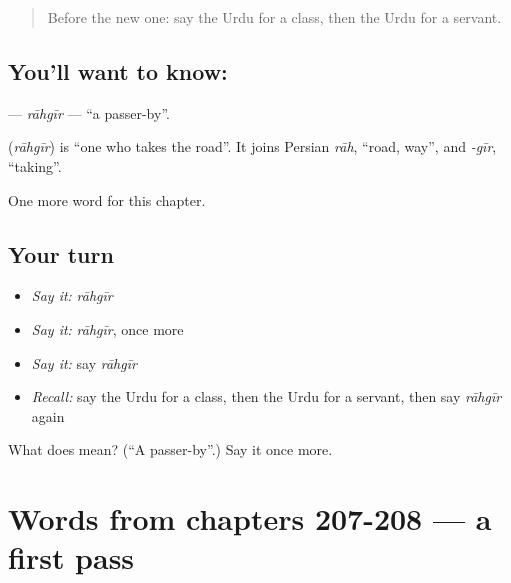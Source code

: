 \begin{quote}
Before the new one: say the Urdu for a class, then the Urdu for a servant.
\end{quote}

\subsection*{You'll want to know: }
\textbf{} — \emph{rāhgīr} — \textquotedblleft{}a passer-by\textquotedblright{}.

\begin{cousinweb}
\textbf{} (\emph{rāhgīr}) is \textquotedblleft{}one who takes the road\textquotedblright{}. It joins Persian \emph{rāh}, \textquotedblleft{}road, way\textquotedblright{}, and \emph{-gīr}, \textquotedblleft{}taking\textquotedblright{}.
\end{cousinweb}

\begin{grammarlens}[title={What you've built}]
One more word for this chapter.
\end{grammarlens}

\subsection*{Your turn}
\begin{itemize}
\raggedright
  \item \emph{Say it:} \emph{rāhgīr}
  \item \emph{Say it:} \emph{rāhgīr}, once more
  \item \emph{Say it:} say \emph{rāhgīr}
  \item \emph{Recall:} say the Urdu for a class, then the Urdu for a servant, then say \emph{rāhgīr} again
\end{itemize}

\begin{tcolorbox}[breakable,colback=teal!4,colframe=teal!35!black,title={Before you move on}]
What does  mean? (\textquotedblleft{}A passer-by\textquotedblright{}.) Say it once more.
\end{tcolorbox}
\section[(dialogue)]{Words from chapters 207-208 — a first pass}

\label{lesson:UR-R211-first-pass-words-from-chapters-207-208}




